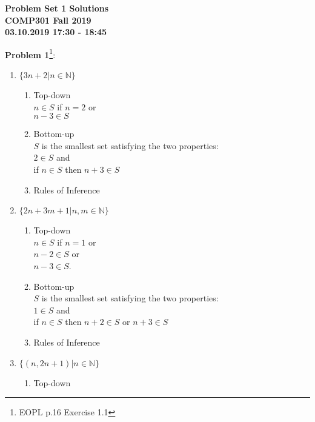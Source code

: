 \documentclass[12pt,reqno]{amsart}
\begin{document}
\begin{center}
\large\textbf{Problem Set 1 Solutions\\ COMP301 Fall 2019} \\
\normalsize\textbf{03.10.2019 17:30 - 18:45} \\
\end{center}


\textbf{Problem 1}\footnote{EOPL p.16 Exercise 1.1}:
\begin{enumerate}
	\item $\{3n+2 | n \in \mathbb{N}\}$
	\begin{enumerate} \item Top-down\\
	$n \in S$ if $n = 2$ or \\
	$n - 3 \in S$ 
	\item Bottom-up\\
	$S$ is the smallest set satisfying the two properties: \\$2 \in S$ and \\
	if $n \in S$ then $n+3 \in S$
	\item Rules of Inference \\
	  \hspace{2mm}
	\end{enumerate}
	\item $\{2n + 3m + 1 | n, m \in \mathbb{N}\}$
	\begin{enumerate} \item Top-down\\
	$n \in S$ if $n = 1$ or \\
	$n - 2 \in S$ or \\
	$n - 3 \in S$.
	\item Bottom-up\\
	$S$ is the smallest set satisfying the two properties:\\$1 \in S$ and \\ 
	if $n \in S$ then $n+2 \in S$ or $n+3 \in S$
	\item Rules of Inference\\
	 \hspace{2mm}
	 \hspace{2mm}
	\end{enumerate}
	\item $\{(n, 2n+1) | n \in \mathbb{N}\}$
	\begin{enumerate} \item Top-down\\

\end{enumerate}
\end{enumerate}
\end{document}
